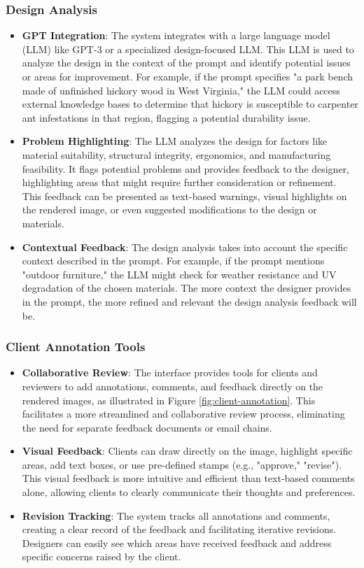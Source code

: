 \subsubsection{Design Analysis}
\begin{itemize}
\item \textbf{GPT Integration}: The system integrates with a large language model (LLM) like GPT-3 or a specialized design-focused LLM. This LLM is used to analyze the design in the context of the prompt and identify potential issues or areas for improvement. For example, if the prompt specifies "a park bench made of unfinished hickory wood in West Virginia," the LLM could access external knowledge bases to determine that hickory is susceptible to carpenter ant infestations in that region, flagging a potential durability issue.
\item \textbf{Problem Highlighting}: The LLM analyzes the design for factors like material suitability, structural integrity, ergonomics, and manufacturing feasibility. It flags potential problems and provides feedback to the designer, highlighting areas that might require further consideration or refinement. This feedback can be presented as text-based warnings, visual highlights on the rendered image, or even suggested modifications to the design or materials.
\item \textbf{Contextual Feedback}: The design analysis takes into account the specific context described in the prompt. For example, if the prompt mentions "outdoor furniture," the LLM might check for weather resistance and UV degradation of the chosen materials. The more context the designer provides in the prompt, the more refined and relevant the design analysis feedback will be.
\end{itemize}

\subsubsection{Client Annotation Tools}
\begin{itemize}
\item \textbf{Collaborative Review}: The interface provides tools for clients and reviewers to add annotations, comments, and feedback directly on the rendered images, as illustrated in Figure \ref{fig:client-annotation}. This facilitates a more streamlined and collaborative review process, eliminating the need for separate feedback documents or email chains.
\item \textbf{Visual Feedback}: Clients can draw directly on the image, highlight specific areas, add text boxes, or use pre-defined stamps (e.g., "approve," "revise"). This visual feedback is more intuitive and efficient than text-based comments alone, allowing clients to clearly communicate their thoughts and preferences.
\item \textbf{Revision Tracking}: The system tracks all annotations and comments, creating a clear record of the feedback and facilitating iterative revisions. Designers can easily see which areas have received feedback and address specific concerns raised by the client.
\end{itemize}

